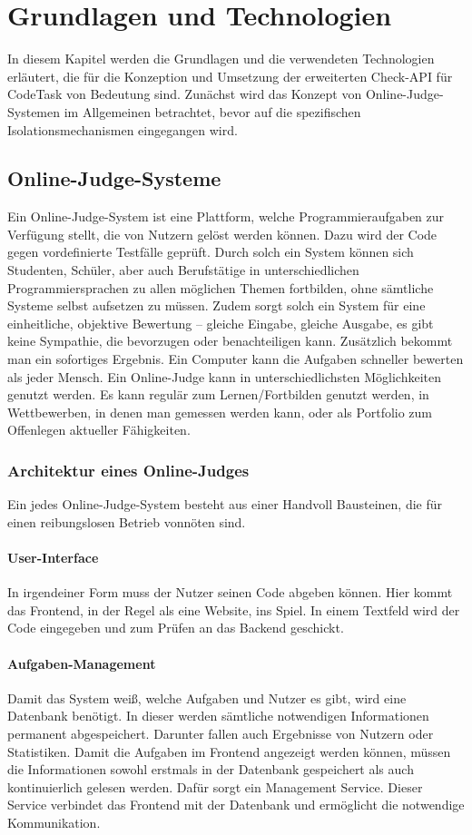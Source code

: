 \chapter{Grundlagen und Technologien}
\label{chap:basicsAndTechnologies}
In diesem Kapitel werden die Grundlagen und die verwendeten Technologien erläutert, die für die Konzeption und Umsetzung der erweiterten Check-API für CodeTask von Bedeutung sind. Zunächst wird das Konzept von Online-Judge-Systemen im Allgemeinen betrachtet, bevor auf die spezifischen Isolationsmechanismen eingegangen wird.

\section{Online-Judge-Systeme}
Ein Online-Judge-System ist eine Plattform, welche Programmieraufgaben zur Verfügung stellt, die von Nutzern gelöst werden können. Dazu wird der Code gegen vordefinierte Testfälle geprüft.
Durch solch ein System können sich Studenten, Schüler, aber auch Berufstätige in unterschiedlichen Programmiersprachen zu allen möglichen Themen fortbilden, ohne sämtliche Systeme selbst aufsetzen zu müssen.
Zudem sorgt solch ein System für eine einheitliche, objektive Bewertung – gleiche Eingabe, gleiche Ausgabe, es gibt keine Sympathie, die bevorzugen oder benachteiligen kann. Zusätzlich bekommt man ein sofortiges Ergebnis. Ein Computer kann die Aufgaben schneller bewerten als jeder Mensch.
Ein Online-Judge kann in unterschiedlichsten Möglichkeiten genutzt werden. Es kann regulär zum Lernen/Fortbilden genutzt werden, in Wettbewerben, in denen man gemessen werden kann, oder als Portfolio zum Offenlegen aktueller Fähigkeiten.

\subsection{Architektur eines Online-Judges}
Ein jedes Online-Judge-System besteht aus einer Handvoll Bausteinen, die für einen reibungslosen Betrieb vonnöten sind.
	\subsubsection{User-Interface}
	In irgendeiner Form muss der Nutzer seinen Code abgeben können. Hier kommt das Frontend, in der Regel als eine Website, ins Spiel. In einem Textfeld wird der Code eingegeben und zum Prüfen an das Backend geschickt.
	\subsubsection{Aufgaben-Management}
	Damit das System weiß, welche Aufgaben und Nutzer es gibt, wird eine Datenbank benötigt. In dieser werden sämtliche notwendigen Informationen permanent abgespeichert. Darunter fallen auch Ergebnisse von Nutzern oder Statistiken.
	Damit die Aufgaben im Frontend angezeigt werden können, müssen die Informationen sowohl erstmals in der Datenbank gespeichert als auch kontinuierlich gelesen werden. Dafür sorgt ein Management Service. Dieser Service verbindet das Frontend mit der Datenbank und ermöglicht die notwendige Kommunikation.
